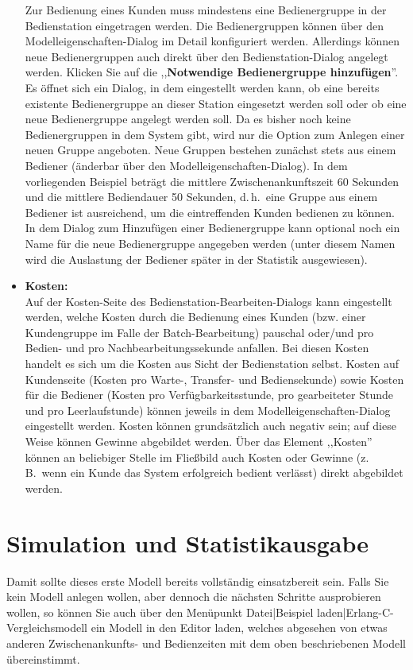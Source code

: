 \documentclass[deutsch]{svmono}
\begin{document}
\begin{itemize}
Zur Bedienung eines Kunden muss mindestens eine Bedienergruppe in der Bedienstation eingetragen werden. Die Bedienergruppen können über den Modelleigenschaften-Dialog im Detail konfiguriert werden. Allerdings können neue Bedienergruppen auch direkt über den Bedienstation-Dialog angelegt werden. Klicken Sie auf die ,,\textbf{Notwendige Bedienergruppe hinzufügen}''. Es öffnet sich ein Dialog, in dem eingestellt werden kann, ob eine bereits existente Bedienergruppe an dieser Station eingesetzt werden soll oder ob eine neue Bedienergruppe angelegt werden soll. Da es bisher noch keine Bedienergruppen in dem System gibt, wird nur die Option zum Anlegen einer neuen Gruppe angeboten. Neue Gruppen bestehen zunächst stets aus einem Bediener (änderbar über den Modelleigenschaften-Dialog). In dem vorliegenden Beispiel beträgt die mittlere Zwischenankunftszeit 60 Sekunden und die mittlere Bediendauer 50 Sekunden, d.\,h.\ eine Gruppe aus einem Bediener ist ausreichend, um die eintreffenden Kunden bedienen zu können. In dem Dialog zum Hinzufügen einer Bedienergruppe kann optional noch ein Name für die neue Bedienergruppe angegeben werden (unter diesem Namen wird die Auslastung der Bediener später in der Statistik ausgewiesen).
\item
\textbf{Kosten:}\\
Auf der Kosten-Seite des Bedienstation-Bearbeiten-Dialogs kann eingestellt werden, welche Kosten durch die Bedienung eines Kunden (bzw. einer Kundengruppe im Falle der Batch-Bearbeitung) pauschal oder/und pro Bedien- und pro Nachbearbeitungssekunde anfallen. Bei diesen Kosten handelt es sich um die Kosten aus Sicht der Bedienstation selbst. Kosten auf Kundenseite (Kosten pro Warte-, Transfer- und Bediensekunde) sowie Kosten für die Bediener (Kosten pro Verfügbarkeitsstunde, pro gearbeiteter Stunde und pro Leerlaufstunde) können jeweils in dem Modelleigenschaften-Dialog eingestellt werden. Kosten können grundsätzlich auch negativ sein; auf diese Weise können Gewinne abgebildet werden. Über das Element ,,Kosten'' können an beliebiger Stelle im Fließbild auch Kosten oder Gewinne (z.\,B.\ wenn ein Kunde das System erfolgreich bedient verlässt) direkt abgebildet werden.
\end{itemize}



\chapter{Simulation und Statistikausgabe}

Damit sollte dieses erste Modell bereits vollständig einsatzbereit sein. Falls Sie kein Modell anlegen wollen, aber dennoch die nächsten Schritte ausprobieren wollen, so können Sie auch über den Menüpunkt Datei|Beispiel laden|Erlang-C-Vergleichsmodell ein Modell in den Editor laden, welches abgesehen von etwas anderen Zwischenankunfts- und Bedienzeiten mit dem oben beschriebenen Modell übereinstimmt.
\end{document}
